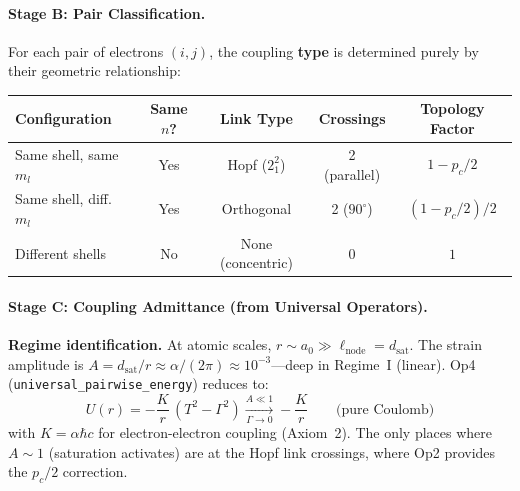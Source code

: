 \paragraph{Stage B: Pair Classification.}
For each pair of electrons $(i, j)$, the coupling \textbf{type}
is determined purely by their geometric relationship:

\begin{center}
\small
\renewcommand{\arraystretch}{1.25}
\begin{tabular}{lcccc}
\toprule
\textbf{Configuration} & \textbf{Same $n$?} & \textbf{Link Type}
& \textbf{Crossings} & \textbf{Topology Factor} \\
\midrule
Same shell, same $m_l$ & Yes & Hopf ($2_1^2$) & 2 (parallel)
& $1 - p_c/2$ \\
Same shell, diff.\ $m_l$ & Yes & Orthogonal & 2 ($90^\circ$)
& $(1 - p_c/2) / 2$ \\
Different shells & No & None (concentric) & 0
& $1$ \\
\bottomrule
\end{tabular}
\end{center}

\paragraph{Stage C: Coupling Admittance (from Universal Operators).}

\noindent\textbf{Regime identification.}
At atomic scales, $r \sim a_0 \gg \ell_{\text{node}} = d_{\text{sat}}$.
The strain amplitude is $A = d_{\text{sat}}/r \approx \alpha/(2\pi)
\approx 10^{-3}$---deep in Regime~I (linear).
Op4 (\texttt{universal\_pairwise\_energy}) reduces to:
\begin{equation}
    U(r) = -\frac{K}{r}\,(T^2 - \Gamma^2)
    \xrightarrow[\Gamma \to 0]{A \ll 1}
    -\frac{K}{r}
    \qquad \text{(pure Coulomb)}
\end{equation}
with $K = \alpha\hbar c$ for electron-electron coupling (Axiom~2).
The only places where $A \sim 1$ (saturation activates) are at
the Hopf link crossings, where Op2 provides the $p_c/2$ correction.

